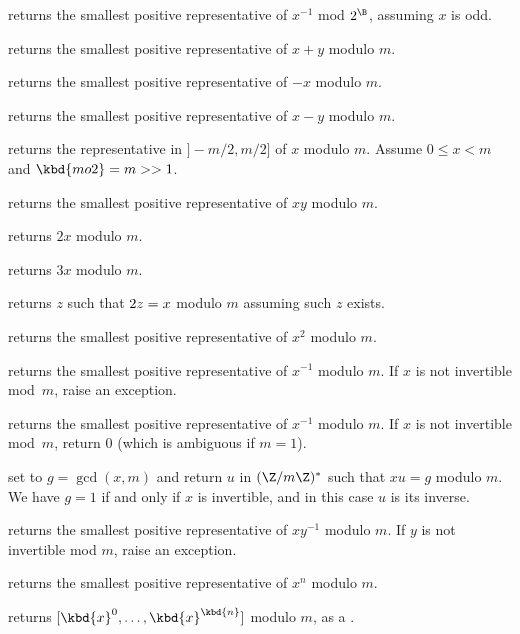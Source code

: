  returns the smallest
positive representative of $x^{-1}$ mod $2^\B$, assuming $x$ is odd.

 returns the smallest
positive representative of $x + y$ modulo $m$.

 returns the smallest
positive representative of $-x$ modulo $m$.

 returns the smallest
positive representative of $x - y$ modulo $m$.

 returns the representative
in $]-m/2,m/2]$ of $x$ modulo $m$. Assume $0 \leq x < m$ and
$\kbd{mo2}  = m >> 1$.

 returns the smallest positive
representative of $x y$ modulo $m$.

 returns $2x$ modulo $m$.

 returns $3x$ modulo $m$.

 returns $z$ such that $2\*z = x$ modulo
$m$ assuming such $z$ exists.

 returns the smallest positive
representative of $x^2$ modulo $m$.

 returns the smallest
positive representative of $x^{-1}$ modulo $m$. If $x$ is not invertible
mod~$m$, raise an exception.

 returns the smallest
positive representative of $x^{-1}$ modulo $m$. If $x$ is not invertible
mod~$m$, return $0$ (which is ambiguous if $m=1$).

 set  to
$g = \gcd(x,m)$ and return $u$ in $(\Z/m\Z)^*$ such that $x u = g$ modulo $m$.
We have $g = 1$ if and only if $x$ is invertible, and in this case $u$
is its inverse.

 returns the smallest
positive representative of $x y^{-1}$ modulo $m$. If $y$ is not invertible
mod $m$, raise an exception.

 returns the smallest
positive representative of $x^n$ modulo $m$.

 returns
$[\kbd{x}^0, \dots, \kbd{x}^\kbd{n}]$ modulo $m$, as a .

